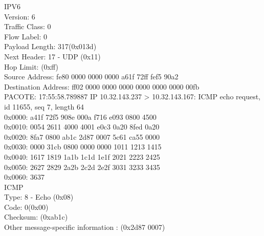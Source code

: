 \documentclass[12pt]{article}
\begin{document}
IPV6 \\
Version: 6 \\
Traffic Class: 0 \\
Flow Label: 0 \\
Payload Length: 317(0x013d) \\
Next Header: 17 - UDP (0x11) \\
Hop Limit: (0xff) \\
Source Address: fe80 0000 0000 0000 a61f 72ff fef5 90a2 \\
Destination Address: ff02 0000 0000 0000 0000 0000 0000 00fb \\
\newpage
PACOTE: 17:55:58.789887 IP 10.32.143.237 > 10.32.143.167: ICMP echo request, id 11655, seq 7, length 64 \\
0x0000:  a41f 72f5 908e 000a f716 e093 0800 4500   \\
0x0010:  0054 2611 4000 4001 e0c3 0a20 8fed 0a20   \\
0x0020:  8fa7 0800 ab1c 2d87 0007 5c61 ca55 0000   \\
0x0030:  0000 31cb 0800 0000 0000 1011 1213 1415   \\
0x0040:  1617 1819 1a1b 1c1d 1e1f 2021 2223 2425   \\
0x0050:  2627 2829 2a2b 2c2d 2e2f 3031 3233 3435   \\
0x0060:  3637  \\

ICMP \\
Type: 8 - Echo (0x08) \\
Code: 0(0x00) \\
Checksum: (0xab1c) \\
Other message-specific information : (0x2d87 0007) \\
\end{document}
